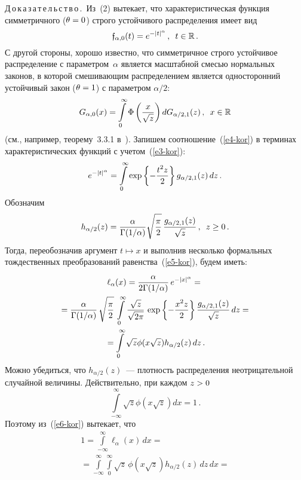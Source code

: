 \begin{multicols}{2}
\noindent
Д\,о\,к\,а\,з\,а\,т\,е\,л\,ь\,с\,т\,в\,о\,.\ Из~(2) вытекает, что характеристическая
функция симметричного ($\theta\hm=0$) строго устойчивого распределения
имеет вид
\begin{equation}
\mathfrak{f}_{\alpha,0}(t)=e^{-|t|^{\alpha}}\,,\enskip t\in\mathbb{R}\,. \label{e3-kor}
\end{equation}
С другой стороны, хорошо известно, что сим\-мет\-рич\-ное строго
устойчивое распределение с па\-ра\-мет\-ром~$\alpha$ является мас\-штаб\-ной
смесью нормальных законов, в которой смешивающим распределением
является односторонний устойчивый закон ($\theta\hm=1$) с параметром
$\alpha/2$:
\begin{equation}
G_{\alpha,0}(x)=\int\limits_{0}^{\infty}\Phi\left(\displaystyle\frac{\displaystyle x\mathstrut}{\displaystyle \sqrt{z}\mathstrut}\right)dG_{\alpha/2,1}(z)\,,\enskip
x\in\mathbb{R}\label{e4-kor}
\end{equation}
(см., например, теорему~3.3.1 в~\cite{Zolotarev1983}). Запишем
соотношение~(\ref{e4-kor}) в терминах характеристических функций с учетом~(\ref{e3-kor}):
\begin{equation}
e^{-|t|^{\alpha}}=\int\limits_0^{\infty}\exp\left\{-\displaystyle\frac{\displaystyle t^2z\mathstrut}{\displaystyle 2\mathstrut}\right\}g_{\alpha/2,1}(z)\,dz\,.
\label{e5-kor}
\end{equation}
Обозначим
$$
h_{\alpha/2}(z)=\displaystyle\frac{\displaystyle \alpha\mathstrut}{\displaystyle \Gamma({1}/{\alpha})\mathstrut}\sqrt{\displaystyle\frac{\displaystyle \pi\mathstrut}{\displaystyle 2\mathstrut}}\,
\displaystyle\frac{\displaystyle g_{\alpha/2,1}(z)\mathstrut}{\displaystyle \sqrt{z}\mathstrut}\,,\enskip
z\ge0\,.
$$
Тогда, переобозначив аргумент $t\mapsto x$ и выполнив несколько
формальных тождественных преобразований равенства~(\ref{e5-kor}), будем иметь:
\begin{multline}
\ell_{\alpha}(x)=\displaystyle\frac{\displaystyle \alpha\mathstrut}{\displaystyle 2\Gamma({1}/{\alpha})\mathstrut}\,e^{-|x|^{\alpha}}={}\\
{}=
\displaystyle\frac{\displaystyle \alpha\mathstrut}{\displaystyle \Gamma({1}/{\alpha})\mathstrut}\,\sqrt{\displaystyle\frac{\displaystyle \pi\mathstrut}{\displaystyle 2\mathstrut}}\,\int\limits_0^{\infty}
\displaystyle\frac{\displaystyle \sqrt{z}\mathstrut}{\displaystyle \sqrt{2\pi}\mathstrut}\,\exp\left\{-\displaystyle\frac{\displaystyle x^2z\mathstrut}{\displaystyle 2\mathstrut}\right\}\displaystyle\frac{\displaystyle g_{\alpha/2,1}(z)\mathstrut}{\displaystyle \sqrt{z}\mathstrut}\,dz
={}\\
{}=\int\limits_0^{\infty}\sqrt{z}\phi(x\sqrt{z})h_{\alpha/2}(z)\,dz\,.\label{e6-kor}
\end{multline}
Можно убедиться, что $h_{\alpha/2}(z)$~--- плотность распределения
неотрицательной случайной величины. Действительно,
при каждом $z\hm>0$
$$
\int\limits_{-\infty}^{\infty}\sqrt{z}\phi\left(x\sqrt{z}\right)dx=1\,.
$$
Поэтому из~(\ref{e6-kor}) вытекает, что
\begin{multline*}
1=\int\limits_{-\infty}^{\infty}\ell_{\alpha}(x)\,dx={}\\
{}=
\int\limits_{-\infty}^{\infty}\int\limits_{0}^{\infty}\sqrt{z}\,\phi(x\sqrt{z})h_{\alpha/2}(z)\,dz\,dx=

\end{multline*}
\end{multicols}
